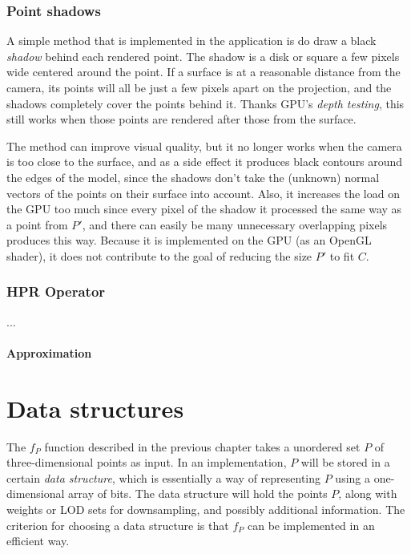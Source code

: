 \documentclass[a4paper,10pt,abstracton,notitlepage]{scrreprt}
\begin{document}
\subsection{Point shadows}
A simple method that is implemented in the application is do draw a black \emph{shadow} behind each rendered point. The shadow is a disk or square a few pixels wide centered around the point. If a surface is at a reasonable distance from the camera, its points will all be just a few pixels apart on the projection, and the shadows completely cover the points behind it. Thanks GPU's \emph{depth testing}, this still works when those points are rendered after those from the surface.

The method can improve visual quality, but it no longer works when the camera is too close to the surface, and as a side effect it produces black contours around the edges of the model, since the shadows don't take the (unknown) normal vectors of the points on their surface into account. Also, it increases the load on the GPU too much since every pixel of the shadow it processed the same way as a point from $P'$, and there can easily be many unnecessary overlapping pixels produces this way. Because it is implemented on the GPU (as an OpenGL shader), it does not contribute to the goal of reducing the size $P'$ to fit $C$.

\subsection{HPR Operator}
...

\subsubsection{Approximation}

\chapter{Data structures}
The $f_{P}$ function described in the previous chapter takes a unordered set $P$ of three-dimensional points as input. In an implementation, $P$ will be stored in a certain \emph{data structure}, which is essentially a way of representing $P$ using a one-dimensional array of bits. The data structure will hold the points $P$, along with weights or LOD sets for downsampling, and possibly additional information. The criterion for choosing a data structure is that $f_{P}$ can be implemented in an efficient way.
\end{document}
